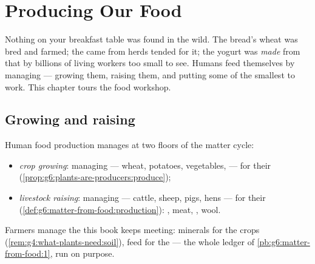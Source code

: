 \chapter{Producing Our Food}\label{ch:g6:producing-our-food}

Nothing on your breakfast table was found in the wild. The
bread's wheat was bred and farmed; the  came from herds
tended for it; the yogurt was \emph{made} from that  by
billions of living workers too small to see. Humans feed
themselves by managing  --- growing them,
raising them, and putting some of the smallest to work. This
chapter tours the food workshop.

\section{Growing and raising}

\begin{definition}\label{def:g6:producing-our-food:farming}
Human food production manages  at two floors of
the matter cycle:
\begin{itemize}
  \item \emph{crop growing}: managing 
        --- wheat, potatoes, vegetables,  --- for their
        (\cref{prop:g6:plants-are-producers:produce});
  \item \emph{livestock raising}: managing
         --- cattle, sheep, pigs, hens --- for
        their 
        (\cref{def:g6:matter-from-food:production}): ,
        meat, , wool.
\end{itemize}
Farmers manage the  this book keeps meeting: 
minerals for the crops (\cref{rem:g4:what-plants-need:soil}),
feed for the  --- the whole ledger of
\cref{pb:g6:matter-from-food:1}, run on purpose.
\end{definition}

